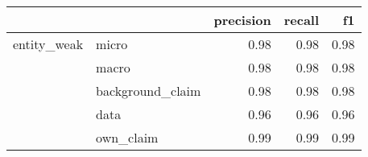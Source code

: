 \begin{tabular}{llrrr}
\toprule
            &           &  precision &  recall &   f1 \\
\midrule
entity\_weak & micro &       0.98 &    0.98 & 0.98 \\
            & macro &       0.98 &    0.98 & 0.98 \\
            & background\_claim &       0.98 &    0.98 & 0.98 \\
            & data &       0.96 &    0.96 & 0.96 \\
            & own\_claim &       0.99 &    0.99 & 0.99 \\
\bottomrule
\end{tabular}
